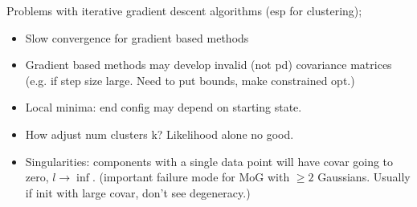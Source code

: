 \documentclass{article}
\begin{document}
Problems with iterative gradient descent algorithms (esp for clustering); \begin{itemize} \item Slow convergence for gradient based methods \item Gradient based methods may develop invalid (not pd) covariance matrices (e.g. if step size large. Need to put bounds, make constrained opt.) \item Local minima: end config may depend on starting state.  \item How adjust num clusters k? Likelihood alone no good.  \item Singularities: components with a single data point will have covar going to zero, $l\rightarrow\inf$. (important failure mode for MoG with $\geq 2$ Gaussians. Usually if init with large covar, don't see degeneracy.) \end{itemize}
\end{document}
